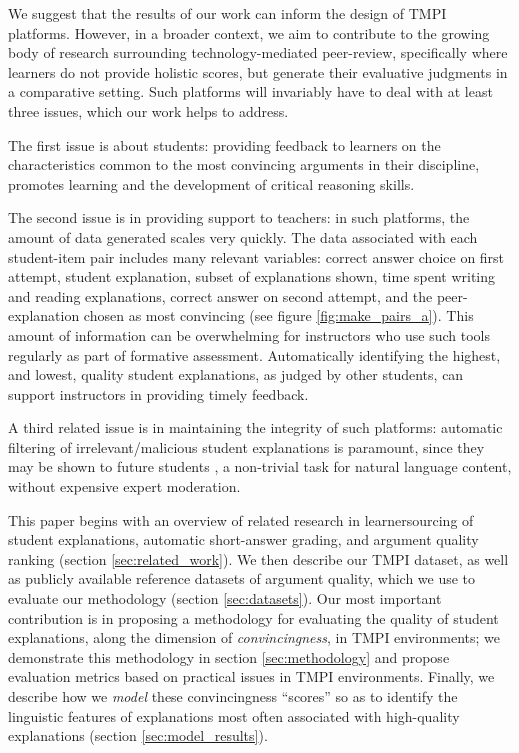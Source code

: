 \documentclass[notitlepage,12pt]{jedm}
\begin{document}
We suggest that the results of our work can inform the design of TMPI platforms.
However, in a broader context, we aim to contribute to the growing body of 
research surrounding technology-mediated peer-review, specifically where 
learners do not provide holistic scores, but generate their evaluative 
judgments in a comparative setting. 
Such platforms will invariably have to deal with at least three issues, which 
our work helps to address.

The first issue is about students: providing feedback to learners on the 
characteristics common to the most convincing arguments in their discipline, 
promotes learning and the development of critical reasoning skills.

The second issue is in providing support to teachers: in such platforms, the 
amount of data generated scales very quickly.
The data associated with each student-item pair includes many relevant 
variables: correct answer choice on first attempt, student explanation, subset 
of explanations shown, time spent writing and reading explanations, correct 
answer on second attempt, and the peer-explanation chosen as most convincing 
(see figure \ref{fig:make_pairs_a}).   
This amount of information can be overwhelming for instructors who use such 
tools regularly as part of formative assessment. 
Automatically identifying the highest, and lowest, quality student 
explanations, as judged by other students, can support instructors in providing 
timely feedback. 

A third related issue is in maintaining the integrity of such platforms: 
automatic filtering of irrelevant/malicious student explanations is paramount, 
since they may be shown to future students \cite{gagnon_filtering_2019}, a 
non-trivial task for natural language content, without expensive expert 
moderation.

This paper begins with an overview of related research in learnersourcing of 
student explanations, automatic short-answer grading, and argument quality 
ranking (section \ref{sec:related_work}).
We then describe our TMPI dataset, as well as publicly available reference 
datasets of argument quality, which we use to evaluate our methodology (section 
\ref{sec:datasets}).
Our most important contribution is in proposing a methodology for evaluating 
the quality of student explanations, along the dimension of 
\textit{convincingness}, in TMPI environments; we demonstrate this methodology 
in section \ref{sec:methodology} and propose evaluation metrics based on 
practical issues in TMPI environments.
Finally, we describe how we \textit{model} these convincingness ``scores'' so 
as to identify the linguistic features of explanations most often associated 
with high-quality explanations (section \ref{sec:model_results}).
\end{document}
